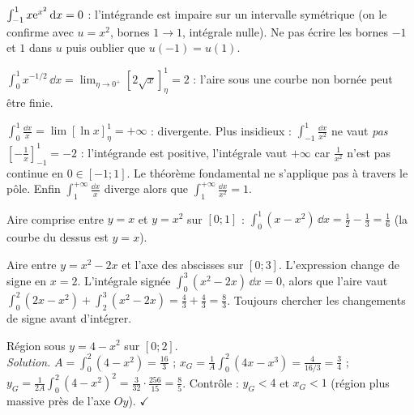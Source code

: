 \begin{cas}
$\int_{-1}^1x\mathrm{e}^{x^2}\,\mathrm{d} x=0$ : l'intégrande est impaire sur un intervalle symétrique (on le confirme avec $u=x^2$, bornes $1\to1$, intégrale nulle). Ne pas écrire les bornes $-1$ et $1$ dans $u$ puis oublier que $u(-1)=u(1)$.
\end{cas}
\begin{exemple}
$\int_0^1x^{-1/2}\,\dd x=\lim_{\eta\to0^+}[2\sqrt x]_\eta^1=2$ : l'aire sous une courbe non bornée peut être finie.
\end{exemple}
\begin{cas}
$\int_0^1\frac{\dd x}x=\lim[\ln x]_\eta^1=+\infty$ : divergente. Plus insidieux : $\int_{-1}^1\frac{\dd x}{x^2}$ ne vaut \emph{pas} $[-\frac1x]_{-1}^1=-2$ : l'intégrande est positive, l'intégrale vaut $+\infty$ car $\frac1{x^2}$ n'est pas continue en $0\in[-1;1]$. Le théorème fondamental ne s'applique pas à travers le pôle. Enfin $\int_1^{+\infty}\frac{\dd x}x$ diverge alors que $\int_1^{+\infty}\frac{\dd x}{x^2}=1$.
\end{cas}
\begin{exemple}
Aire comprise entre $y=x$ et $y=x^2$ sur $[0;1]$ : $\int_0^1(x-x^2)\,\dd x=\frac12-\frac13=\frac16$ (la courbe du dessus est $y=x$).
\end{exemple}
\begin{cas}
Aire entre $y=x^2-2x$ et l'axe des abscisses sur $[0;3]$. L'expression change de signe en $x=2$. L'intégrale signée $\int_0^3(x^2-2x)\,\dd x=0$, alors que l'aire vaut $\int_0^2(2x-x^2)+\int_2^3(x^2-2x)=\frac43+\frac43=\frac83$. Toujours chercher les changements de signe avant d'intégrer.
\end{cas}
\begin{exemple}
Région sous $y=4-x^2$ sur $[0;2]$.\\
\emph{Solution.} $A=\int_0^2(4-x^2)=\frac{16}3$ ; $x_G=\frac1A\int_0^2(4x-x^3)=\frac{4}{16/3}=\frac34$ ; $y_G=\frac1{2A}\int_0^2(4-x^2)^2=\frac{3}{32}\cdot\frac{256}{15}=\frac85$. Contrôle : $y_G<4$ et $x_G<1$ (région plus massive près de l'axe $Oy$). $\checkmark$
\end{exemple}

